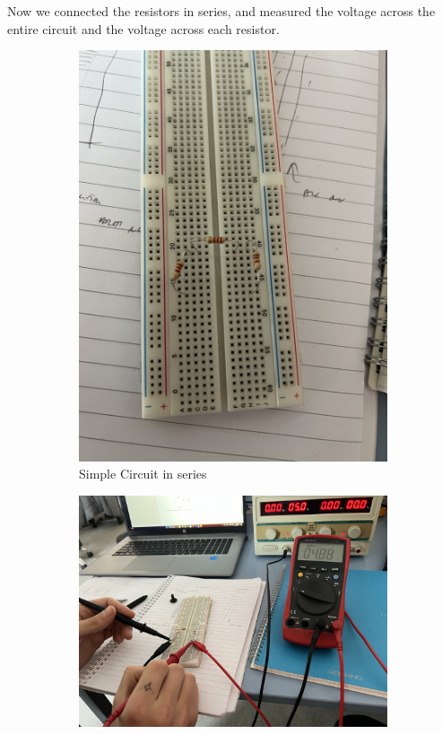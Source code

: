 \documentclass[a4paper, 10pt]{article}
\begin{document}
				Now we connected the resistors in series, and measured the voltage across the entire circuit and the voltage across each resistor.
				\begin{figure}[h]
					\centering
						\begin{subfigure}[h]{0.25\textwidth}
							\includegraphics[width=\textwidth]{./images/SimpleCircuitInSeries.jpeg}
							\caption{Simple Circuit in series}
							\label{sub-fig:SimpleCircuitInSeries}
						\end{subfigure}
						\hspace{0.5cm} %
						\begin{subfigure}[h]{0.65\textwidth}
							\includegraphics[width=\textwidth]{./images/MeasuringVoltageOfACircuit.jpeg}

\end{subfigure}
\end{figure}
\end{document}
